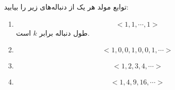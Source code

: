 \EXERCISE
توابع مولد هر یک از دنباله‌های زیر را بیابید:
\begin{enumerate}
\item
$$<1, 1, \cdots, 1>$$
طول دنباله برابر
$k$
است.
\item
$$<1, 0, 0, 1, 0, 0, 1, \cdots>$$
\item
$$<1, 2, 3, 4, \cdots>$$
\item
$$<1, 4, 9, 16, \cdots>$$
\end{enumerate}